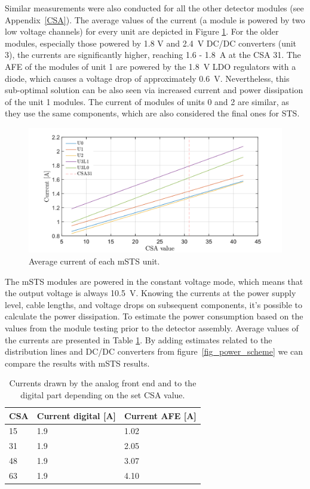 Similar measurements were also conducted for all the other detector modules (see Appendix~\ref{CSA}). The average values of the current (a module is powered by two low voltage channels) for every unit are depicted in Figure \ref{fig_avg}. For the older modules, especially those powered by 1.8 V and 2.4~V DC/DC converters (unit 3), the currents are significantly higher, reaching 1.6 - 1.8~A at the \gls{CSA} 31. The \gls{AFE} of the modules of unit 1 are powered by the 1.8~V \gls{LDO} regulators with a diode, which causes a voltage drop of approximately 0.6~V. Nevertheless, this sub-optimal solution can be also seen via increased current and power dissipation of the unit 1 modules. The current of modules of units 0 and 2 are similar, as they use the same components, which are also considered the final ones for \gls{STS}.

\begin{figure}[h!]
\centering
\includegraphics[width=0.9\columnwidth]{Chapter6/DCS/images/units.png}
\caption{Average current of each \gls{mSTS} unit.}
\label{fig_avg}
\end{figure}
\newpage
The \gls{mSTS} modules are powered in the constant voltage mode, which means that the output voltage is always 10.5~V. Knowing the currents at the power supply level, cable lengths, and voltage drops on subsequent components, it's possible to calculate the power dissipation. 
To estimate the power consumption based on the values from the module testing prior to the detector assembly. Average values of the currents are presented in Table \ref{tab:typical_cons}. By adding estimates related to the distribution lines and DC/DC converters from figure~\ref{fig_power_scheme} we can compare the results with \gls{mSTS} results. 
\begin{table}[!h]
\caption{Currents drawn by the analog front end and to the digital part depending on the set \gls{CSA} value.}
\centering
\begin{tabular}{lll}
\hline
CSA & Current digital {[}A{]} & Current \gls{AFE} {[}A{]} \\ \hline
15  & 1.9                 & 1.02                    \\
31  & 1.9                 & 2.05                    \\
48  & 1.9                 & 3.07                    \\
63  & 1.9                 & 4.10                    \\ \hline
\end{tabular}

\label{tab:typical_cons}
\end{table}

